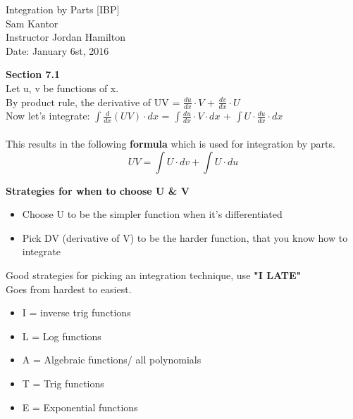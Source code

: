 \documentclass{letter}
\begin{document}
\begin{center}
\Huge{Integration by Parts [IBP]} \\
\large{Sam Kantor \\ Instructor Jordan Hamilton} \\
\large{Date: January 6st, 2016}
\end{center}

\textbf{Section 7.1} \\

Let u, v be functions of x.\\ By product rule, the derivative of UV = $\frac{du}{dx} \cdot V$ + $\frac{dv}{dx} \cdot U$ \\
Now let's integrate: $\int \frac{d}{dx} (UV)\cdot dx$ = $\int \frac{du}{dx} \cdot V\cdot dx$ + $\int U\cdot \frac{du}{dx}\cdot dx$ \\ \\
This results in the following \textbf{formula} which is used for integration by parts. \\

   $$UV = \int U\cdot dv + \int U\cdot du$$

\textbf{Strategies for when to choose U \& V}
\begin{itemize}
\item Choose U to be the simpler function when it's differentiated 
\item Pick DV (derivative of V) to be the harder function, that you know how to integrate
\end{itemize}

Good strategies for picking an integration technique, use \textbf{"I LATE"} \\
Goes from hardest to easiest.

\begin{itemize}
\item I = inverse trig functions
\item L = Log functions
\item A = Algebraic functions/ all polynomials
\item T = Trig functions
\item E = Exponential functions
\end{itemize}
\end{document}
